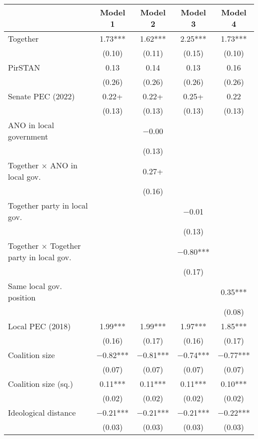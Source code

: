 \begin{table}
\centering
\begin{tabular}[t]{lcccc}
\toprule
  & Model 1 & Model 2 & Model 3 & Model 4\\
\midrule
Together & \num{1.73}*** & \num{1.62}*** & \num{2.25}*** & \num{1.73}***\\
 & (\num{0.10}) & (\num{0.11}) & (\num{0.15}) & (\num{0.10})\\
PirSTAN & \num{0.13} & \num{0.14} & \num{0.13} & \num{0.16}\\
 & (\num{0.26}) & (\num{0.26}) & (\num{0.26}) & (\num{0.26})\\
Senate PEC (2022) & \num{0.22}+ & \num{0.22}+ & \num{0.25}+ & \num{0.22}\\
 & (\num{0.13}) & (\num{0.13}) & (\num{0.13}) & (\num{0.13})\\
ANO in local government &  & \num{-0.00} &  & \\
 &  & (\num{0.13}) &  & \\
Together × ANO in local gov. &  & \num{0.27}+ &  & \\
 &  & (\num{0.16}) &  & \\
Together party in local gov. &  &  & \num{-0.01} & \\
 &  &  & (\num{0.13}) & \\
Together × Together party in local gov. &  &  & \num{-0.80}*** & \\
 &  &  & (\num{0.17}) & \\
Same local gov. position &  &  &  & \num{0.35}***\\
 &  &  &  & (\num{0.08})\\
Local PEC (2018) & \num{1.99}*** & \num{1.99}*** & \num{1.97}*** & \num{1.85}***\\
 & (\num{0.16}) & (\num{0.17}) & (\num{0.16}) & (\num{0.17})\\
Coalition size & \num{-0.82}*** & \num{-0.81}*** & \num{-0.74}*** & \num{-0.77}***\\
 & (\num{0.07}) & (\num{0.07}) & (\num{0.07}) & (\num{0.07})\\
Coalition size (sq.) & \num{0.11}*** & \num{0.11}*** & \num{0.11}*** & \num{0.10}***\\
 & (\num{0.02}) & (\num{0.02}) & (\num{0.02}) & (\num{0.02})\\
Ideological distance & \num{-0.21}*** & \num{-0.21}*** & \num{-0.21}*** & \num{-0.22}***\\
 & (\num{0.03}) & (\num{0.03}) & (\num{0.03}) & (\num{0.03})\\

\end{tabular}
\end{table}
